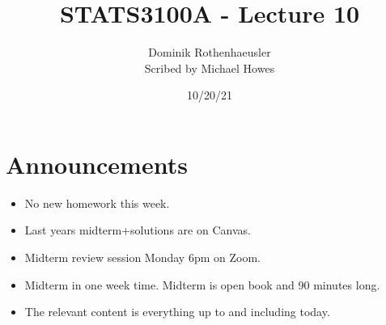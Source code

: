 




\title{STATS3100A - Lecture 10}
\author{Dominik Rothenhaeusler\\ Scribed by Michael Howes}
\date{10/20/21}

\pagestyle{fancy}
\fancyhf{}


\maketitle
\tableofcontents
\section{Announcements}
\begin{itemize}
    \item No new homework this week.
    \item Last years midterm+solutions are on Canvas.
    \item Midterm review session Monday 6pm on Zoom.
    \item Midterm in one week time. Midterm is open book and 90 minutes long.
    \item The relevant content is everything up to and including today.
\end{itemize}
